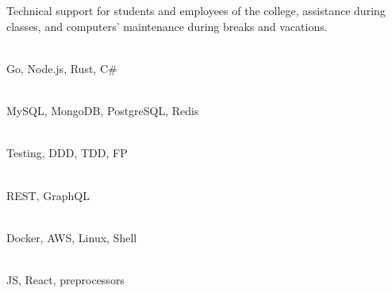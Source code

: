 \documentclass[12pt]{resume}
\begin{document}
    \begin{textblock}
        \\
        \\
        Technical support for students and employees of the college, assistance
        during classes, and computers' maintenance during breaks and vacations.
    \end{textblock}
    
    \newpage
    
    
    \begin{minipage}[t]{.5\linewidth}
    
        \begin{textblock}
            \\
            Go, Node.js, Rust, C\#
        \end{textblock}
    
        \begin{textblock}
            \\
            MySQL, MongoDB, PostgreSQL, Redis
        \end{textblock}
    
        \begin{textblock}
            \\
            Testing, DDD, TDD, FP
        \end{textblock}
    
    \end{minipage}
    \begin{minipage}[t]{.475\linewidth}
    
        \begin{textblock}
            \\
            REST, GraphQL
        \end{textblock}
    
        \begin{textblock}
            \\
            Docker, AWS, Linux, Shell
        \end{textblock}
    
        \begin{textblock}
            \\
            JS, React, preprocessors
        \end{textblock}
    
    \end{minipage}
    
\end{document}

